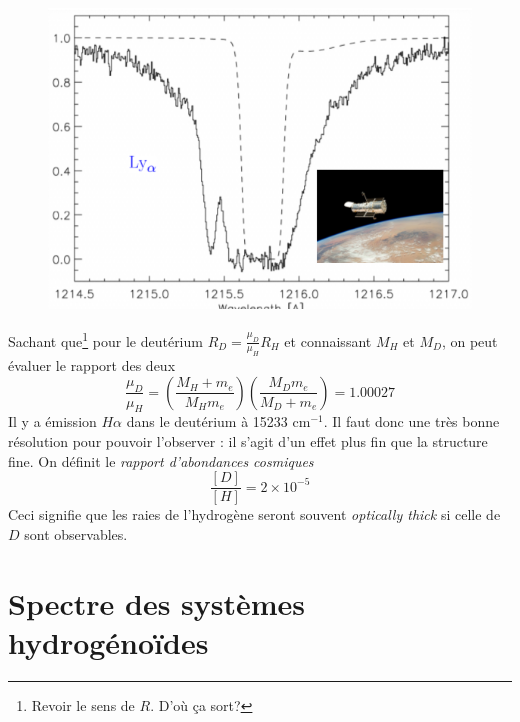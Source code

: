 \newpage
	\begin{figure}
	\includegraphics[scale=0.3]{ch1/image6}
	\end{figure}
Sachant que\footnote{Revoir le sens de $R$. D'où ça sort?} pour le deutérium $R_D = \frac{\mu_D}{\mu_H}R_H$ 
et connaissant $M_H$ et $M_D$, on peut évaluer le rapport des deux
\begin{equation}
\frac{\mu_D}{\mu_H} = \left(\frac{M_H+m_e}{M_Hm_e}\right)\left(\frac{M_Dm_e}{M_D+m_e}\right)=1.00027
\end{equation}
Il y a émission $H\alpha$ dans le deutérium à 15233 cm$^{-1}$. Il faut donc une très bonne résolution pour
pouvoir l'observer : il s'agit d'un effet plus fin que la structure fine. On définit le \textit{rapport 
d'abondances cosmiques}
\begin{equation}
\frac{[D]}{[H]}=2\times 10^{-5}
\end{equation}
Ceci signifie que les raies de l'hydrogène seront souvent \textit{optically thick} si celle de $D$ sont 
observables.

\section{Spectre des systèmes hydrogénoïdes}
